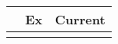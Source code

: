 \begin{tabular}{lcc}
\toprule
{} & Ex & Current \\
\midrule
{} &    &         \\
\bottomrule
\end{tabular}
